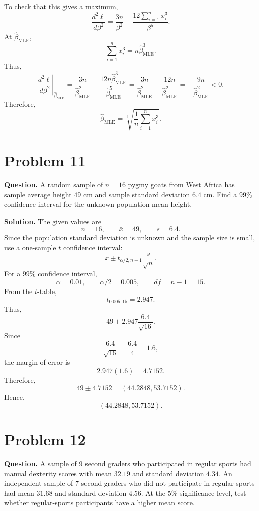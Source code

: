 \documentclass[11pt]{article}
\begin{document}
To check that this gives a maximum,
\[
\frac{d^2\ell}{d\beta^2}=\frac{3n}{\beta^2}-\frac{12\sum_{i=1}^{n}x_i^3}{\beta^5}.
\]
At $\hat\beta_{\text{MLE}}$,
\[
\sum_{i=1}^{n}x_i^3=n\hat\beta_{\text{MLE}}^3.
\]
Thus,
\[
\left.\frac{d^2\ell}{d\beta^2}\right|_{\hat\beta_{\text{MLE}}}
=\frac{3n}{\hat\beta_{\text{MLE}}^2}-\frac{12n\hat\beta_{\text{MLE}}^3}{\hat\beta_{\text{MLE}}^5}
=\frac{3n}{\hat\beta_{\text{MLE}}^2}-\frac{12n}{\hat\beta_{\text{MLE}}^2}
=-\frac{9n}{\hat\beta_{\text{MLE}}^2}<0.
\]
Therefore,
\[
\boxed{\hat\beta_{\text{MLE}}=\sqrt[3]{\frac{1}{n}\sum_{i=1}^{n}x_i^3}}.
\]

\newpage
\section*{Problem 11}

\textbf{Question.} A random sample of $n=16$ pygmy goats from West Africa has sample average height $49$ cm and sample standard deviation $6.4$ cm. Find a $99\%$ confidence interval for the unknown population mean height.

\textbf{Solution.} The given values are
\[
n=16, \qquad \bar x=49, \qquad s=6.4.
\]
Since the population standard deviation is unknown and the sample size is small, use a one-sample $t$ confidence interval:
\[
\bar x\pm t_{\alpha/2,n-1}\frac{s}{\sqrt n}.
\]
For a $99\%$ confidence interval,
\[
\alpha=0.01, \qquad \alpha/2=0.005, \qquad df=n-1=15.
\]
From the $t$-table,
\[
t_{0.005,15}=2.947.
\]
Thus,
\[
49\pm 2.947\frac{6.4}{\sqrt{16}}.
\]
Since
\[
\frac{6.4}{\sqrt{16}}=\frac{6.4}{4}=1.6,
\]
the margin of error is
\[
2.947(1.6)=4.7152.
\]
Therefore,
\[
49\pm 4.7152=(44.2848,53.7152).
\]
Hence,
\[
\boxed{(44.2848,53.7152)}.
\]

\newpage
\section*{Problem 12}

\textbf{Question.} A sample of 9 second graders who participated in regular sports had manual dexterity scores with mean $32.19$ and standard deviation $4.34$. An independent sample of 7 second graders who did not participate in regular sports had mean $31.68$ and standard deviation $4.56$. At the $5\%$ significance level, test whether regular-sports participants have a higher mean score.
\end{document}
